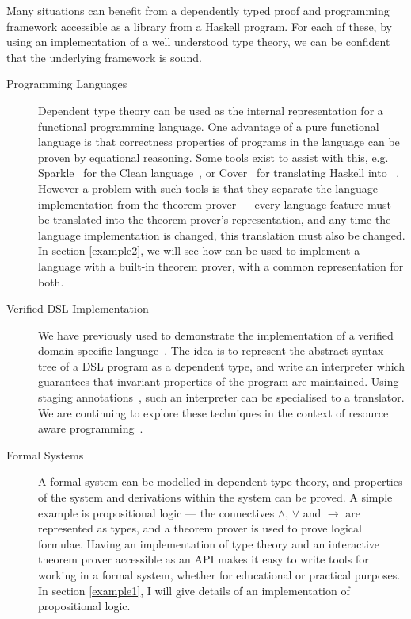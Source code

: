 Many situations can benefit from a dependently typed proof and
programming framework accessible as a library from a Haskell program.
For each of these, by using an implementation of a well understood
type theory, we can be confident that the underlying framework is
sound. 


\begin{description}
\item[Programming Languages] 
Dependent type theory can be used as the internal representation for a
functional programming language. 
One advantage of a pure functional language is that correctness
properties of programs in the language can be proven by equational
reasoning.  Some tools exist to assist with this,
e.g. Sparkle~\cite{sparkle} for the Clean language~\cite{clean}, or
Cover~\cite{cover} for translating Haskell into
\Agda{}~\cite{agda}. However a problem with such tools is that they
separate the language implementation from the theorem prover --- every
language feature must be translated into the theorem prover's
representation, and any time the language implementation is changed,
this translation must also be changed.
In section
\ref{example2}, we will see how \Ivor{} can be used to implement a
language with a built-in theorem prover, with a common representation
for both.

\item[Verified DSL Implementation]
We have previously used \Ivor{} to demonstrate the implementation of
a verified domain specific language~\cite{dtpmsp-gpce}. The idea is to
represent the abstract syntax tree of a DSL program as a dependent
type, and write an interpreter which guarantees that invariant
properties of the program are maintained. Using staging
annotations~\cite{multi-taha}, such an interpreter can be specialised
to a translator. We are continuing to explore these techniques in the
context of resource aware programming~\cite{dt-framework}.

\item[Formal Systems] 

A formal system can be modelled in dependent type theory, and
properties of the system and derivations within the system can be
proved. A simple example is propositional logic --- the connectives
$\land$, $\lor$ and $\to$ are represented as types, and a theorem
prover is used to prove logical formulae.  Having an implementation of
type theory and an interactive theorem prover accessible as an API
makes it easy to write tools for working in a formal system, whether
for educational or practical purposes.  In section \ref{example1}, I
will give details of an implementation of propositional logic.

\end{description}

